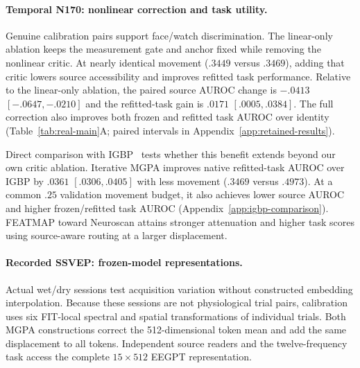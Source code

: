 \paragraph{Temporal N170: nonlinear correction and task utility.}
Genuine calibration pairs support face/watch discrimination. The linear-only
ablation keeps the measurement gate and anchor fixed while removing the
nonlinear critic. At nearly identical movement ($.3449$ versus $.3469$), adding that
critic lowers source accessibility and improves refitted task performance.
Relative to the linear-only ablation, the paired source AUROC change is
$-.0413$ $[-.0647,-.0210]$ and the refitted-task gain is $.0171$
$[.0005,.0384]$. The full correction also
improves both frozen and refitted task AUROC over identity
(Table~\ref{tab:real-main}A; paired intervals in
Appendix~\ref{app:retained-results}).

Direct comparison with IGBP~\citep{iskander2023} tests whether this benefit
extends beyond our own critic ablation. Iterative MGPA improves native
refitted-task AUROC over IGBP by $.0361$
$[.0306,.0405]$ with less movement ($.3469$ versus $.4973$).
At a common $.25$ validation movement budget, it also achieves lower source
AUROC and higher frozen/refitted task AUROC
(Appendix~\ref{app:igbp-comparison}). FEATMAP toward Neuroscan attains
stronger attenuation and higher task scores using source-aware routing
at a larger displacement.

\paragraph{Recorded SSVEP: frozen-model representations.}
\label{sec:recorded-result}
Actual wet/dry sessions test acquisition variation without constructed
embedding interpolation. Because these sessions are not physiological
trial pairs, calibration uses six FIT-local spectral and spatial
transformations of individual trials. Both MGPA constructions correct the
512-dimensional token mean and add the same displacement to all tokens.
Independent source readers and the twelve-frequency task access the
complete $15\times512$ EEGPT representation.

\begin{table}[htbp]
\centering\small
\caption{\textbf{Source attenuation and task utility on recorded EEG.}
Native outputs: N170 (A, 10 participants) and wet/dry SSVEP (B, 21).
$S$: maximum independent source AUROC over the eleven-reader bank in A and
the 41-reader full-input bank in B; $T_f/T_r$: frozen/refitted task AUROC;
$M$: relative movement. Iterative estimates average three fits;
native movements differ. IGBP uses 100 projections with the same
longer-training preset in both studies (Appendix~\ref{app:igbp-protocol}).
Source-aware rows require device identity.
Reference 0/1 denotes Neuroscan/Flex in A and dry/wet in B.
N/A: paired FEATMAP requires physiological wet/dry
trial pairs, unavailable in B.}
\label{tab:real-main}

\end{table}


